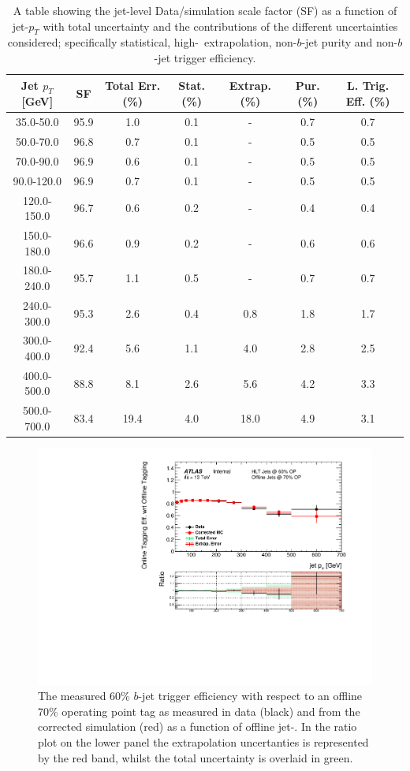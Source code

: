 \begin{table}[!ht]
  \begin{tabular}{|c||c|c||c|c|c|c|}
    \hline
    Jet $p_T$ [GeV] & SF & Total Err. (\%) & Stat. (\%) & Extrap. (\%) & Pur. (\%) & L. Trig. Eff. (\%)\\
    \hline
    35.0-50.0 & 95.9 & 1.0 & 0.1 & - & 0.7 & 0.7\\
    50.0-70.0 & 96.8 & 0.7 & 0.1 & - & 0.5 & 0.5\\
    70.0-90.0 & 96.9 & 0.6 & 0.1 & - & 0.5 & 0.5\\
    90.0-120.0 & 96.9 & 0.7 & 0.1 & - & 0.5 & 0.5\\
    120.0-150.0 & 96.7 & 0.6 & 0.2 & - & 0.4 & 0.4\\
    150.0-180.0 & 96.6 & 0.9 & 0.2 & - & 0.6 & 0.6\\
    180.0-240.0 & 95.7 & 1.1 & 0.5 & - & 0.7 & 0.7\\
    \hline
    240.0-300.0 & 95.3 & 2.6 & 0.4 & 0.8 & 1.8 & 1.7\\
    300.0-400.0 & 92.4 & 5.6 & 1.1 & 4.0 & 2.8 & 2.5\\
    400.0-500.0 & 88.8 & 8.1 & 2.6 & 5.6 & 4.2 & 3.3\\
    500.0-700.0 & 83.4 & 19.4 & 4.0 & 18.0 & 4.9 & 3.1\\
    \hline
\end{tabular}
  \caption{A table showing the jet-level Data/simulation scale factor (SF) as a function of jet-$p_{T}$
    with total uncertainty and the contributions of the different uncertainties considered;
    specifically statistical, high-\pT~extrapolation, non-$b$-jet purity and non-$b$-jet trigger efficiency.}
\label{tab:bTrig_jetSys}
\end{table}

\begin{figure}[!ht]
  \begin{center}
    \includegraphics[width=0.8\linewidth, angle=0]{figs/Trigger/fullSys_EfficiencyComp_jetPt.eps}
  \end{center}
  \caption{
    The measured 60\% $b$-jet trigger efficiency with respect to an offline 70\% operating point tag
    as measured in data (black) and from the corrected simulation (red) as a function of offline jet-\pT.
    In the ratio plot on the lower panel the extrapolation uncertanties is represented by the red band, whilst the total uncertainty is overlaid in green.
    \label{fig:bTrig_jetSys_effComp}
  }
\end{figure}

